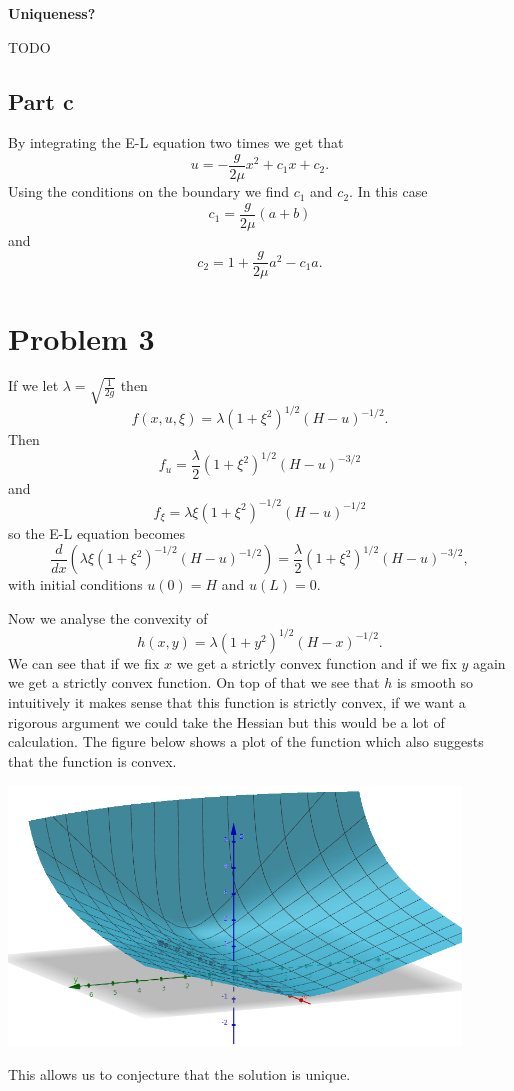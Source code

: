 \documentclass{article}
\begin{document}
\textbf{Uniqueness?}

TODO
\subsection{Part c}
By integrating the E-L equation two times we get that
\[
	u=-\frac{g}{2\mu} x^2 +c_1x+c_2.
\]
Using the conditions on the boundary we find $c_1$ and $c_2$. In this case
\[
	c_1=\frac{g}{2\mu}(a+b)
\]
and
\[
	c_2=1+\frac{g}{2\mu}a^2-c_1a.
\]
\section{Problem 3}
If we let $\lambda=\sqrt{\frac{1}{2g}}$ then
\[
	f(x,u,\xi)=\lambda(1+\xi^2)^{1/2}(H-u)^{-1/2}.
\]
Then
\[
	f_u=\frac{\lambda}{2}(1+\xi^2)^{1/2}(H-u)^{-3/2}
\]
and
\[
	f_\xi=\lambda\xi(1+\xi^2)^{-1/2}(H-u)^{-1/2}
\]
so the E-L equation becomes
\[
	\frac{d}{dx}(\lambda\xi(1+\xi^2)^{-1/2}(H-u)^{-1/2})
	=\frac{\lambda}{2}(1+\xi^2)^{1/2}(H-u)^{-3/2},
\]
with initial conditions $u(0)=H$ and $u(L)=0$.

Now we analyse the convexity of
\[
	h(x,y)=\lambda (1+y^2)^{1/2}(H-x)^{-1/2}.
\]
We can see that if we fix $x$ we get a strictly convex function and if we fix
$y$ again we get a strictly convex function. On top of that we see
that $h$ is smooth so intuitively it makes sense that this function
is strictly convex, if we want a rigorous argument we could take the Hessian
but this would be a lot of calculation. The figure below shows a plot of the
function which also suggests that the function is convex.

\includegraphics[width=0.9\textwidth]{convex.png}

This allows us to conjecture that the solution is unique.
\end{document}
